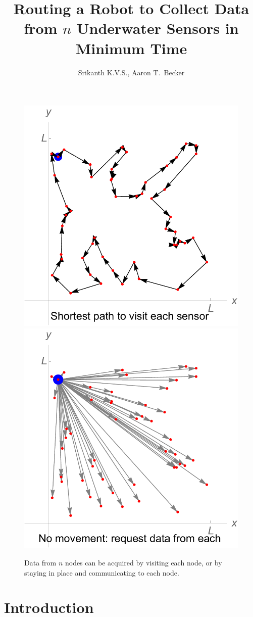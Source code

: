 \documentclass{article}
\begin{document}
\title{Routing a Robot to Collect Data from $n$ Underwater Sensors in Minimum Time}
\author{Srikanth K.V.S., Aaron T.\ Becker}
\maketitle

\begin{figure}[htb]
\begin{center}
	\includegraphics[width=0.48\columnwidth]{ShortestPathToSensors}
	\includegraphics[width=0.48\columnwidth]{CommToEachSensor}
\end{center}
\caption{Data from $n$ nodes can be acquired by visiting each node, or by staying in place and communicating to each node.
\label{fig:ShortestPath}}
\end{figure}




\section{Introduction}
\end{document}
